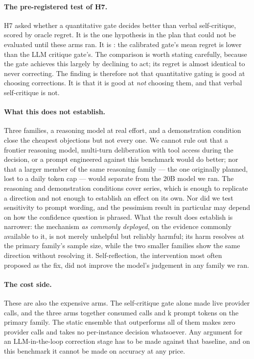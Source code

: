 \paragraph{The pre-registered test of H7.}
H7 asked whether a quantitative gate decides better than verbal self-critique, scored by
oracle regret. It is the one hypothesis in the plan that could not be evaluated until
these arms ran. It is \textbf{\verdictHSeven}: the calibrated gate's mean regret is
\statHSeven{} lower than the LLM critique gate's. The comparison is worth stating
carefully, because the gate achieves this largely by declining to act; its regret is
almost identical to never correcting. The finding is therefore not that quantitative
gating is good at choosing corrections. It is that it is good at \emph{not} choosing
them, and that verbal self-critique is not.

\paragraph{What this does not establish.}
Three families, a reasoning model at real effort, and a demonstration condition close the
cheapest objections but not every one. We cannot rule out that a frontier reasoning model,
multi-turn deliberation with tool access during the decision, or a prompt engineered
against this benchmark would do better; nor that a larger member of the same reasoning
family --- the one originally planned, lost to a daily token cap --- would separate from
the 20B model we ran. The reasoning and demonstration conditions cover \reasonSeries{}
series, which is enough to replicate a direction and not enough to establish an effect on
its own. Nor did we test sensitivity to prompt wording, and the pessimism result in particular
may depend on how the confidence question is phrased. What the result does establish
is narrower: the mechanism
\emph{as commonly deployed}, on the evidence commonly available to it, is not merely
unhelpful but reliably harmful; its harm resolves at the primary family's sample size, while the two smaller families show the same direction without resolving it. Self-reflection, the intervention most often proposed as the fix, did not improve the model's judgement in any family we ran.

\paragraph{The cost side.}
These are also the expensive arms. The self-critique gate alone made
\llmCallsCritiqueGate{} live provider calls, and the three arms together consumed
\llmCallsTotal{} calls and \llmPromptTokensThousands{}k prompt tokens on the primary
family. The static ensemble that outperforms all of them makes zero
provider calls and takes no per-instance decision whatsoever. Any argument for an
LLM-in-the-loop correction stage has to be made against that baseline, and on this
benchmark it cannot be made on accuracy at any price.
